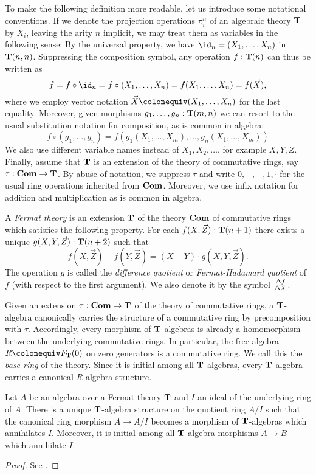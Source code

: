 {To make the following definition more readable, let us introduce some notational conventions.
If we denote the projection operations \(\pi^n_i\) of an algebraic theory \(\mathbf{T}\) by \(X_i\), leaving the arity \(n\) implicit, we may treat them as {variables} in the following sense:
By the universal property, we have \(\id_n = (X_1,\dots,X_n)\) in \(\mathbf{T}(n,n)\).
Suppressing the composition symbol, any operation \(f : \mathbf{T}(n)\) can thus be written as
\[f = f\circ \id_n = f \circ (X_1,\dots,X_n) = f(X_1,\dots,X_n) = f(\vec X),\]
where we employ vector notation \(\vec X \colonequiv (X_1,\dots,X_n)\) for the last equality.
Moreover, given morphisms \(g_1,\dots,g_n : \mathbf{T}(m,n)\) we can resort to the usual substitution notation for composition, as is common in algebra:
\[f \circ (g_1,\dots,g_n) = f(g_1(X_1,\dots,X_m),\dots,g_n(X_1,\dots,X_m))\]
We also use different variable names instead of \(X_1,X_2,\dots\), for example \(X,Y,Z\).
Finally, assume that \(\mathbf{T}\) is an extension of the theory of commutative rings, say \(\tau : \mathbf{Com} \to \mathbf{T}\).
By abuse of notation, we suppress \(\tau\) and write \(0,+,-,1,\cdot\) for the usual ring operations inherited from \(\mathbf{Com}\).
Moreover, we use infix notation for addition and multiplication as is common in algebra.

\begin{definition}
  A \emph{Fermat theory} is an extension \(\mathbf{T}\) of the theory \(\mathbf{Com}\) of commutative rings which satisfies the following property.
  For each \(f(X,\vec{Z}) : \mathbf{T}(n+1)\) there exists a unique \(g(X,Y,\vec{Z}) : \mathbf{T}(n+2)\) such that
  \[
    f(X,\vec{Z}) - f(Y,\vec{Z}) = (X-Y)\cdot g(X,Y,\vec{Z}).
  \]
  The operation \(g\) is called the \emph{difference quotient} or \emph{Fermat-Hadamard quotient} of \(f\) (with respect to the first argument).
  We also denote it by the symbol \(\frac{\Delta{f}}{\Delta{X}}\).
\end{definition}

Given an extension \(\tau:\mathbf{Com}\to\mathbf{T}\) of the theory of commutative rings, a \(\mathbf{T}\)-algebra canonically carries the structure of a commutative ring by precomposition with \(\tau\).
Accordingly, every morphism of \(\mathbf{T}\)-algebras is already a homomorphism between the underlying commutative rings.
In particular, the free algebra \(R\colonequiv F_\TT(0)\) on zero generators is a commutative ring.
We call this the \emph{base ring} of the theory.
Since it is initial among all \(\mathbf{T}\)-algebras, every \(\mathbf{T}\)-algebra carries a canonical \(R\)-algebra structure.

\begin{proposition}
  Let \(A\) be an algebra over a Fermat theory \(\mathbf{T}\) and \(I\) an ideal of the underlying ring of \(A\).
  There is a unique \(\mathbf{T}\)-algebra structure on the quotient ring \(A/I\) such that the canonical ring morphism \(A \to A/I\) becomes a morphism of \(\mathbf{T}\)-algebras which annihilates \(I\).
  Moreover, it is initial among all \(\mathbf{T}\)-algebra morphisms \(A\to B\) which annihilate \(I\).
\end{proposition}
\begin{proof}
  See \cite[Proposition 1.2]{DK84} .
\end{proof}

}
